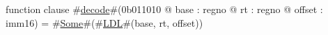 function clause #\hyperref[zdecode]{decode}#(0b011010 @ base : regno @ rt : regno @ offset : imm16) =
  #\hyperref[zSome]{Some}#(#\hyperref[zLDL]{LDL}#(base, rt, offset))
